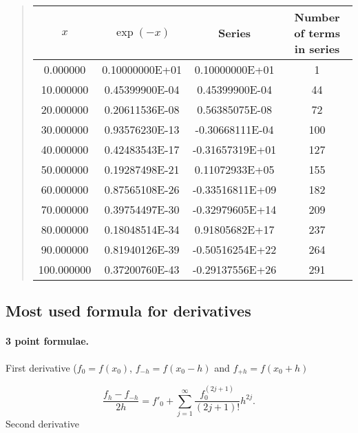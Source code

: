 \documentclass[%
oneside,                 %
final,                   %
10pt]{article}
\begin{document}
{{{{{{\begin{quote}
\begin{tabular}{cccc}
\hline
\multicolumn{1}{c}{ $x$ } & \multicolumn{1}{c}{ $\exp{(-x)}$ } & \multicolumn{1}{c}{ Series } & \multicolumn{1}{c}{ Number of terms in series } \\
\hline
0.000000   & 0.10000000E+01 & 0.10000000E+01  & 1                         \\
10.000000  & 0.45399900E-04 & 0.45399900E-04  & 44                        \\
20.000000  & 0.20611536E-08 & 0.56385075E-08  & 72                        \\
30.000000  & 0.93576230E-13 & -0.30668111E-04 & 100                       \\
40.000000  & 0.42483543E-17 & -0.31657319E+01 & 127                       \\
50.000000  & 0.19287498E-21 & 0.11072933E+05  & 155                       \\
60.000000  & 0.87565108E-26 & -0.33516811E+09 & 182                       \\
70.000000  & 0.39754497E-30 & -0.32979605E+14 & 209                       \\
80.000000  & 0.18048514E-34 & 0.91805682E+17  & 237                       \\
90.000000  & 0.81940126E-39 & -0.50516254E+22 & 264                       \\
100.000000 & 0.37200760E-43 & -0.29137556E+26 & 291                       \\
\hline
\end{tabular}
\end{quote}

\noindent



\subsection{Most used formula for derivatives}


\paragraph{3 point formulae.}
First derivative  ($f_0 = f(x_0)$, $f_{-h}=f(x_0-h)$ and $f_{+h}=f(x_0+h)$

\[
   \frac{f_h-f_{-h}}{2h}=f'_0+\sum_{j=1}^{\infty}\frac{f_0^{(2j+1)}}{(2j+1)!}h^{2j}.
\]
Second derivative

}}}}}}
\end{document}
